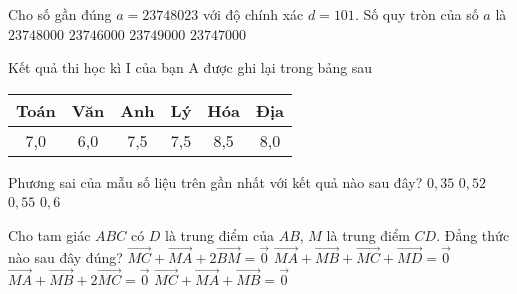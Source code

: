 		\begin{ex}%
		Cho số gần đúng $a=23748023$ với độ chính xác $d=101$. Số quy tròn của số $a$ là
		\choice
		{\True $23748000$}
		{$23746000$}
		{$23749000$}
		{$23747000$}
	\end{ex}
\begin{ex}%
	Kết quả thi học kì I của bạn A được ghi lại trong bảng sau
	\begin{center}
		\begin{tabular}{|c|c|c|c|c|c|}
			\hline Toán & Văn & Anh & Lý & Hóa & Địa \\
			\hline 7{,}0 & 6{,}0 & 7{,}5 & 7{,}5 & 8{,}5 & 8{,}0 \\
			\hline
		\end{tabular}
	\end{center}
		Phương sai của mẫu số liệu trên gần nhất với kết quả nào sau đây?
	\choice
	{$0{,}35$}
	{$0{,}52$}
	{$0{,}55$}
	{\True $0{,}6$}
\end{ex}
	\begin{ex}%
		Cho tam giác $ABC$ có $D$ là trung điểm của $AB$, $M$ là trung điểm $CD$. Đẳng thức nào sau đây đúng?
		\choice
		{$\overrightarrow{MC}+\overrightarrow{MA}+2\overrightarrow{BM}=\overrightarrow{0}$}
		{$\overrightarrow{MA}+\overrightarrow{MB}+\overrightarrow{MC}+\overrightarrow{MD}=\overrightarrow{0}$}
		{\True $\overrightarrow{MA}+\overrightarrow{MB}+2\overrightarrow{MC}=\overrightarrow{0}$}
		{$\overrightarrow{MC}+\overrightarrow{MA}+\overrightarrow{MB}=\overrightarrow{0}$}
	\end{ex}

